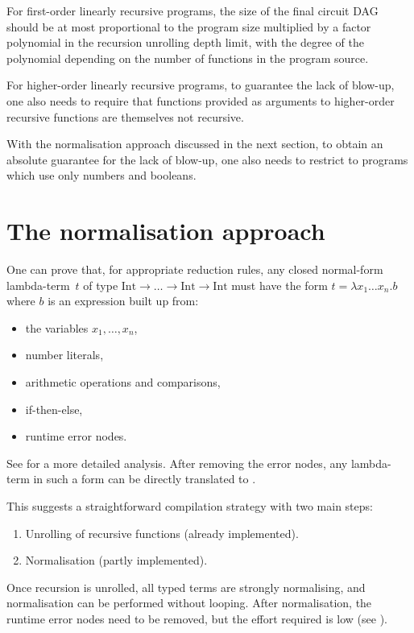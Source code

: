 \documentclass[final]{msc}
\begin{document}
For first-order linearly recursive programs, the size of the final
circuit DAG should be at most proportional to the program size
multiplied by a factor polynomial in the recursion unrolling depth
limit, with the degree of the polynomial depending on the number of
functions in the program source.

For higher-order linearly recursive programs, to guarantee the lack of
blow-up, one also needs to require that functions provided as arguments
to higher-order recursive functions are themselves not recursive.

With the normalisation approach discussed in the next section, to obtain an absolute guarantee for the lack of blow-up, one
also needs to restrict to programs which use only numbers and booleans.

\section{The normalisation approach}\label{sec_normalisation}

One can prove that, for appropriate reduction rules, any closed
\JuvixCore{} normal-form lambda-term~$t$ of type $\mathrm{Int} \to \ldots
\to \mathrm{Int} \to \mathrm{Int}$ must have the form $t = \lambda x_1
\ldots x_n . b$ where $b$ is an expression built up from:
\begin{itemize}
\item the variables $x_1,\ldots,x_n$,
\item number literals,
\item arithmetic operations and comparisons,
\item if-then-else,
\item runtime error nodes.
\end{itemize}
See  for a more detailed
analysis. After removing the error nodes, any lambda-term in such a form
can be directly translated to \VampIR{}.

This suggests a straightforward compilation strategy with two main
steps:
\begin{enumerate}
\item Unrolling of recursive functions (already implemented).
\item Normalisation (partly implemented).
\end{enumerate}
Once recursion is unrolled, all typed terms are strongly normalising,
and normalisation can be performed without looping. After
normalisation, the runtime error nodes need to be removed, but the effort required is low (see ).
\end{document}
